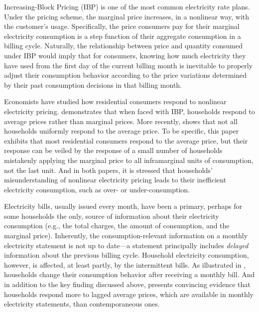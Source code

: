Increasing-Block Pricing (IBP) is one of the most common electricity rate plans. Under the pricing scheme, the marginal price increases, in a nonlinear way, with the customer's usage. Specifically, the price consumers pay for their marginal electricity consumption is a step function of their aggregate consumption in a billing cycle. Naturally, the relationship between price and quantity consumed under IBP would imply that for consumers, knowing how much electricity they have used from the first day of the current billing month is inevitable to properly adjust their consumption behavior according to the price variations determined by their past consumption decisions in that billing month. 

Economists have studied how residential consumers respond to nonlinear electricity pricing. \cite{Do-Consumers-Respond-to-Marginal-or-Average-Price?-Evidence-from-Nonlinear-Electricity-Pricing_2014_(Ito)} demonstrates that when faced with IBP, households respond to average prices rather than marginal prices. More recently, \cite{Misunderstanding-Nonlinear-Prices_2020_(Shaffer)} shows that not all households uniformly respond to the average price. To be specific, this paper exhibits that most residential consumers respond to the average price, but their response can be veiled by the response of a small number of households mistakenly applying the marginal price to all inframarginal units of consumption, not the last unit. And in both papers, it is stressed that households' misunderstanding of nonlinear electricity pricing leads to their inefficient electricity consumption, such as over- or under-consumption.

Electricity bills, usually issued every month, have been a primary, perhaps for some households the only, source of information about their electricity consumption (e.g., the total charges, the amount of consumption, and the marginal price). Inherently, the consumption-relevant information on a monthly electricity statement is not up to date---a statement principally includes \textit{delayed} information about the previous billing cycle. Household electricity consumption, however, is affected, at least partly, by the intermittent bills. As illustrated in \cite{Dynamic-Salience-with-Intermittent-Billing_Gilbert-and-Zivin_2014}, households change their consumption behavior after receiving a monthly bill. And in addition to the key finding discussed above, \cite{Do-Consumers-Respond-to-Marginal-or-Average-Price?-Evidence-from-Nonlinear-Electricity-Pricing_2014_(Ito)} presents convincing evidence that households respond more to lagged average prices, which are available in monthly electricity statements, than contemporaneous ones. 

